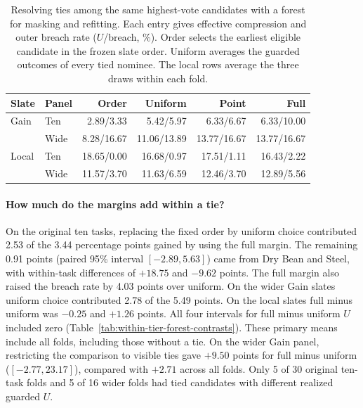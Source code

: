 \begin{table}[tb]
\centering\small
\caption{Resolving ties among the same highest-vote candidates with a forest for masking and refitting. Each entry gives effective compression and outer breach rate ($U$/breach, \%). Order selects the earliest eligible candidate in the frozen slate order. Uniform averages the guarded outcomes of every tied nominee. The local rows average the three draws within each fold.}
\label{tab:within-tier-forest}
\begin{tabular}{@{}llrrrr@{}}
\toprule
Slate & Panel & Order & Uniform & Point & Full\\
\midrule
Gain & Ten  & 2.89/3.33   & 5.42/5.97   & 6.33/6.67   & 6.33/10.00\\
     & Wide & 8.28/16.67  & 11.06/13.89 & 13.77/16.67 & 13.77/16.67\\
Local & Ten  & 18.65/0.00 & 16.68/0.97  & 17.51/1.11  & 16.43/2.22\\
      & Wide & 11.57/3.70 & 11.63/6.59  & 12.46/3.70  & 12.89/5.56\\
\bottomrule
\end{tabular}
\end{table}

\paragraph{How much do the margins add within a tie?}
On the original ten tasks, replacing the fixed order by uniform choice contributed 2.53 of the 3.44 percentage points gained by using the full margin. The remaining 0.91 points (paired 95\% interval $[-2.89,5.63]$) came from Dry Bean and Steel, with within-task differences of $+18.75$ and $-9.62$ points. The full margin also raised the breach rate by 4.03 points over uniform. On the wider Gain slates uniform choice contributed 2.78 of the 5.49 points. On the local slates full minus uniform was $-0.25$ and $+1.26$ points. All four intervals for full minus uniform $U$ included zero (Table~\ref{tab:within-tier-forest-contrasts}). These primary means include all folds, including those without a tie. On the wider Gain panel, restricting the comparison to visible ties gave $+9.50$ points for full minus uniform ($[-2.77,23.17]$), compared with $+2.71$ across all folds. Only 5 of 30 original ten-task folds and 5 of 16 wider folds had tied candidates with different realized guarded $U$.

